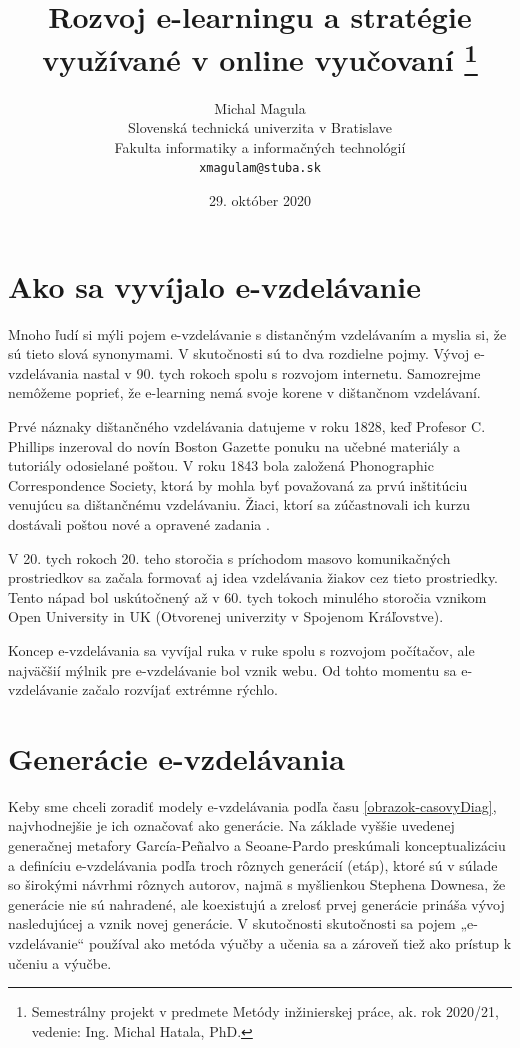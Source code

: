 \documentclass[10pt,slovak,a4paper]{article}
\title
{
	Rozvoj e-learningu a stratégie využívané v online vyučovaní
	\thanks
	{
		Semestrálny projekt v predmete Metódy inžinierskej práce, ak. rok 2020/21, vedenie: Ing. Michal Hatala, PhD.
	}
} %
\author{Michal Magula\\[2pt]
	{\small Slovenská technická univerzita v Bratislave}\\
	{\small Fakulta informatiky a informačných technológií}\\
	{\small \texttt{xmagulam@stuba.sk}}
	}
\date{\small 29. október 2020}
\begin{document}
\maketitle

\begin{abstract}
	
\end{abstract}

\section{Ako sa vyvíjalo e-vzdelávanie} \label{Evolution}

	Mnoho ľudí si mýli pojem e-vzdelávanie s distančným vzdelávaním a myslia si, že sú tieto slová synonymami.
	V skutočnosti sú to dva rozdielne pojmy. Vývoj e-vzdelávania nastal v 90. tych rokoch spolu s rozvojom internetu.
	Samozrejme nemôžeme poprieť, že e-learning nemá svoje korene v dištančnom vzdelávaní.\cite{main}

	Prvé náznaky dištančného vzdelávania datujeme v roku 1828, keď Profesor C. Phillips inzeroval do novín
	Boston Gazette ponuku na učebné materiály a tutoriály odosielané poštou. V roku 1843 bola 
	založená Phonographic Correspondence Society, ktorá by mohla byť považovaná za prvú inštitúciu 
	venujúcu sa dištančnému vzdelávaniu. Žiaci, ktorí sa zúčastnovali ich kurzu dostávali poštou
	nové a opravené zadania \cite{main}.

	V 20. tych rokoch 20. teho storočia s príchodom masovo komunikačných prostriedkov sa začala formovať aj idea
	vzdelávania žiakov cez tieto prostriedky. Tento nápad bol uskútočnený až v 60. tych tokoch minulého storočia 
	vznikom Open University in UK (Otvorenej univerzity v Spojenom Kráľovstve).\cite{main}

	Koncep e-vzdelávania sa vyvíjal ruka v ruke spolu s rozvojom počítačov, ale 
	najväčšií mýlnik pre e-vzdelávanie bol vznik webu. Od tohto momentu sa 
	e-vzdelávanie začalo rozvíjať extrémne rýchlo.\cite{main}



\section{Generácie e-vzdelávania} \label{Generations}

	Keby sme chceli zoradiť modely e-vzdelávania podľa času \ref*{obrazok-casovyDiag}, najvhodnejšie je ich označovať ako generácie. Na základe vyššie uvedenej generačnej metafory García-Peñalvo a Seoane-Pardo preskúmali konceptualizáciu a definíciu e-vzdelávania podľa troch rôznych generácií (etáp), ktoré sú v súlade so širokými návrhmi rôznych autorov, najmä s myšlienkou Stephena Downesa, že generácie nie sú nahradené, ale koexistujú a zrelosť prvej generácie prináša vývoj nasledujúcej a vznik novej generácie. V skutočnosti skutočnosti sa pojem „e-vzdelávanie“ používal ako metóda výučby a učenia sa a zároveň tiež ako prístup k učeniu a výučbe.
	\cite{main}
\end{document}
